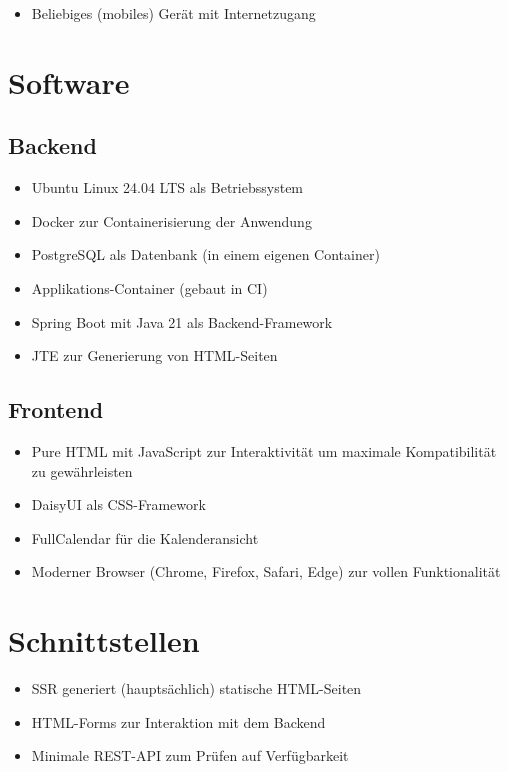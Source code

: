 \begin{itemize}
    \item Beliebiges (mobiles) Gerät mit Internetzugang
\end{itemize}

\section{Software}

\subsection{Backend}

\begin{itemize}
    \item Ubuntu Linux 24.04 LTS als Betriebssystem
    \item Docker zur Containerisierung der Anwendung
    \item PostgreSQL als Datenbank (in einem eigenen Container)
    \item Applikations-Container (gebaut in CI)
    \item Spring Boot mit Java 21 als Backend-Framework
    \item JTE zur Generierung von HTML-Seiten
\end{itemize}

\subsection{Frontend}

\begin{itemize}
    \item Pure HTML mit JavaScript zur Interaktivität um maximale Kompatibilität zu gewährleisten
    \item DaisyUI als CSS-Framework
    \item FullCalendar für die Kalenderansicht
    \item Moderner Browser (Chrome, Firefox, Safari, Edge) zur vollen Funktionalität
\end{itemize}

\section{Schnittstellen}

\begin{itemize}
    \item SSR generiert (hauptsächlich) statische HTML-Seiten
    \item HTML-Forms zur Interaktion mit dem Backend
    \item Minimale REST-API zum Prüfen auf Verfügbarkeit
\end{itemize}